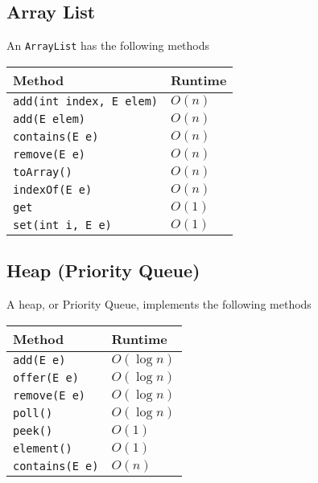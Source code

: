 \documentclass{article}
\begin{document}
    \subsection{Array List}
    An \texttt{ArrayList} has the following methods
    \begin{table}[H]
        \begin{center}
            \begin{tabular}[c]{|l|l|}
                \hline
                 Method&Runtime  \\
                \hline
                 \texttt{add(int index, E elem)}& \( O\left( n \right) \) \\
                 \texttt{add(E elem)}& \( O\left( n \right) \) \\
                 \texttt{contains(E e)}& \( O(n) \) \\
                   \texttt{remove(E e)}& \( O(n) \) \\
                   \texttt{toArray()}& \( O(n) \) \\
                   \texttt{indexOf(E e)}& \( O(n) \) \\
                 \texttt{get}& \( O(1) \) \\
                 \texttt{set(int i, E e)} & \( O(1) \) \\
                \hline
            \end{tabular}
        \end{center}
    \end{table}
    \subsection{Heap (Priority Queue)}
    A heap, or Priority Queue, implements the following methods

    \begin{table}[H]
        \begin{center}
            \begin{tabular}[c]{|l|l|}
                \hline
                Method & Runtime \\
                \hline
                \texttt{add(E e)}& \( O\left( \log n \right) \)  \\
                \texttt{offer(E e)}& \( O\left( \log n \right) \)  \\
                \texttt{remove(E e)}& \( O\left( \log n \right) \)  \\
                \texttt{poll()}& \( O\left( \log n \right) \)  \\
                \texttt{peek()}& \( O(1) \)  \\
                \texttt{element()}& \( O(1) \)  \\
                \texttt{contains(E e)}& \( O(n) \)  \\
                \hline
            \end{tabular}
        \end{center}
    \end{table}
\end{document}
